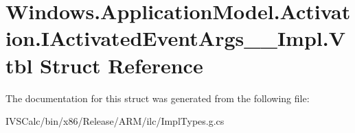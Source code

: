 \hypertarget{struct_windows_1_1_application_model_1_1_activation_1_1_i_activated_event_args_____impl_1_1_vtbl}{}\section{Windows.\+Application\+Model.\+Activation.\+I\+Activated\+Event\+Args\+\_\+\+\_\+\+Impl.\+Vtbl Struct Reference}
\label{struct_windows_1_1_application_model_1_1_activation_1_1_i_activated_event_args_____impl_1_1_vtbl}


The documentation for this struct was generated from the following file\+:\begin{DoxyCompactItemize}
\item 
I\+V\+S\+Calc/bin/x86/\+Release/\+A\+R\+M/ilc/Impl\+Types.\+g.\+cs\end{DoxyCompactItemize}
